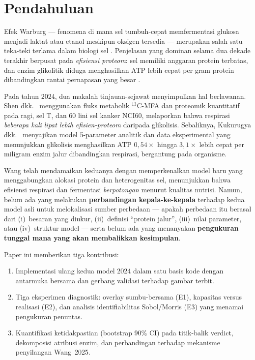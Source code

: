 \section{Pendahuluan}

Efek Warburg --- fenomena di mana sel tumbuh-cepat memfermentasi glukosa
menjadi laktat atau etanol meskipun oksigen tersedia --- merupakan salah
satu teka-teki terlama dalam biologi sel \cite{warburg1956}.
Penjelasan yang dominan selama dua dekade terakhir berpusat pada
\textit{efisiensi proteom}: sel memiliki anggaran protein terbatas, dan
enzim glikolitik diduga menghasilkan ATP lebih cepat per gram protein
dibandingkan rantai pernapasan yang besar \cite{basan2015, pfeiffer2001}.

Pada tahun 2024, dua makalah tinjauan-sejawat menyimpulkan hal
berlawanan. Shen dkk.\ \cite{shen2024} menggunakan fluks metabolik
$^{13}$C-MFA dan proteomik kuantitatif pada ragi, sel T, dan 60 lini
sel kanker NCI60, melaporkan bahwa respirasi \textit{beberapa kali lipat
lebih efisien-proteom} daripada glikolisis. Sebaliknya, Kukurugya dkk.\
\cite{kukurugya2024} menyajikan model 5-parameter analitik dan data
eksperimental yang menunjukkan glikolisis menghasilkan ATP $0{,}54\times$
hingga $3{,}1\times$ lebih cepat per miligram enzim jalur dibandingkan
respirasi, bergantung pada organisme.

Wang \cite{wang2025} telah mendamaikan keduanya dengan memperkenalkan
model baru yang menggabungkan alokasi protein dan heterogenitas sel,
menunjukkan bahwa efisiensi respirasi dan fermentasi \textit{berpotongan}
menurut kualitas nutrisi. Namun, belum ada yang melakukan
\textbf{perbandingan kepala-ke-kepala} terhadap kedua model asli untuk
melokalisasi sumber perbedaan --- apakah perbedaan itu berasal dari
(i)~besaran yang diukur, (ii)~definisi ``protein jalur'',
(iii)~nilai parameter, atau (iv)~struktur model --- serta belum ada yang
menanyakan \textbf{pengukuran tunggal mana yang akan membalikkan kesimpulan}.

Paper ini memberikan tiga kontribusi:
\begin{enumerate}
    \item Implementasi ulang kedua model 2024 dalam satu basis kode
          dengan antarmuka bersama dan gerbang validasi terhadap gambar terbit.
    \item Tiga eksperimen diagnostik: overlay sumbu-bersama (E1),
          kapasitas versus realisasi (E2), dan analisis identifiabilitas
          Sobol/Morris (E3) yang menamai pengukuran penuntas.
    \item Kuantifikasi ketidakpastian (bootstrap 90\% CI) pada titik-balik
          verdict, dekomposisi atribusi enzim, dan perbandingan terhadap
          mekanisme penyilangan Wang~2025.
\end{enumerate}
